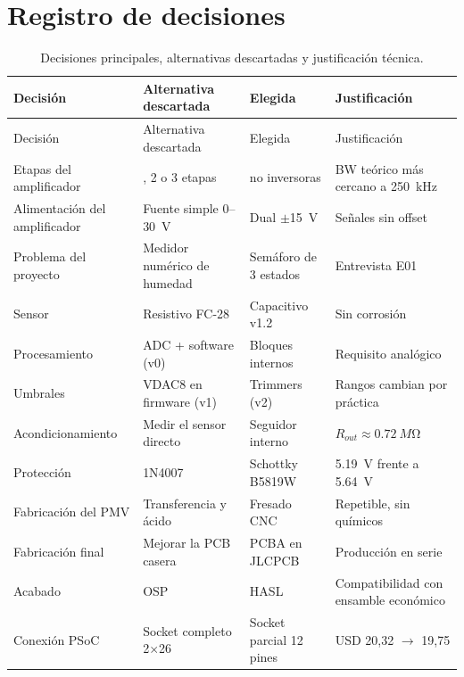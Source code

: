 \documentclass[11pt,a4paper]{article}
\begin{document}
\section{Registro de decisiones}\label{sec:decisiones}
\begin{longtable}{>{\raggedright\arraybackslash}p{3.0cm}>{\raggedright\arraybackslash}p{4.0cm}>{\raggedright\arraybackslash}p{3.4cm}>{\raggedright\arraybackslash}p{3.9cm}}
\caption{Decisiones principales, alternativas descartadas y justificación técnica.}\\
\toprule
Decisión & Alternativa descartada & Elegida & Justificación \\
\midrule\endfirsthead
\toprule Decisión & Alternativa descartada & Elegida & Justificación \\ \midrule\endhead
Etapas del amplificador & 1, 2 o 3 etapas & 4 no inversoras & BW teórico más cercano a \SI{250}{kHz} \\
Alimentación del amplificador & Fuente simple 0--\SI{30}{V} & Dual $\pm$\SI{15}{V} & Señales sin offset \\
Problema del proyecto & Medidor numérico de humedad & Semáforo de 3 estados & Entrevista E01 \\
Sensor & Resistivo FC-28 & Capacitivo v1.2 & Sin corrosión \\
Procesamiento & ADC + software (v0) & Bloques internos & Requisito analógico \\
Umbrales & VDAC8 en firmware (v1) & Trimmers (v2) & Rangos cambian por práctica \\
Acondicionamiento & Medir el sensor directo & Seguidor interno & $R_{out}\approx\SI{0.72}{M\ohm}$ \\
Protección & 1N4007 & Schottky B5819W & \SI{5.19}{V} frente a \SI{5.64}{V} \\
Fabricación del PMV & Transferencia y ácido & Fresado CNC & Repetible, sin químicos \\
Fabricación final & Mejorar la PCB casera & PCBA en JLCPCB & Producción en serie \\
Acabado & OSP & HASL & Compatibilidad con ensamble económico \\
Conexión PSoC & Socket completo 2$\times$26 & Socket parcial 12 pines & USD 20,32 $\rightarrow$ 19,75 \\
\bottomrule
\end{longtable}

\end{document}
